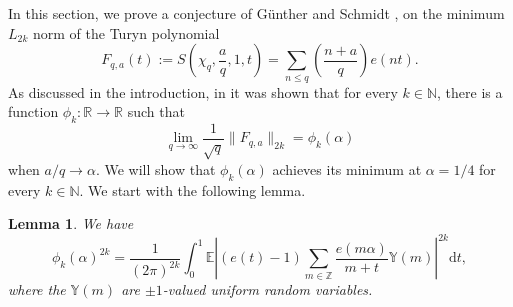 \documentclass[12pt, a4paper]{amsart}
\newtheorem{lemma}{Lemma}
\theoremstyle{remark}
\newcommand{\ud}{\mathrm{d}}
\newcommand{\bY}{\mathbb{Y}}
\begin{document}
In this section, we prove a conjecture of G\"unther and Schmidt \cite{GuentherSchmidt2017}, on the minimum $L_{2k}$ norm of the Turyn polynomial
\begin{equation}
    F_{q, a}(t) := S\left( \chi_q, \frac{a}{q}, 1, t \right) = \sum_{n\leq q} \left(\frac{n+a}{q}\right)e(nt).\nonumber
\end{equation}
As discussed in the introduction, in \cite{GuentherSchmidt2017} it was shown that for every $k\in\mathbb N$, there is a function $\phi_k:\mathbb R\to\mathbb R$ such that
\begin{equation}\nonumber
    \lim_{q\to\infty} \frac{1}{\sqrt q}\|F_{q, a}\|_{2k}=\phi_k(\alpha) 
\end{equation}
when $a/q\to \alpha$. We will show that $\phi_k(\alpha)$ achieves its minimum
at $\alpha = 1/4$ for every $k\in\mathbb N$. We start with the following lemma. 
\begin{lemma}
    We have
\begin{equation}\label{eq:phi_k}
    \phi_{k}(\alpha)^{2k} = \frac{1}{(2\pi)^{2k}}
    \int_0^1
        \mathbb E\left\lvert(e(t)-1)\sum_{m\in\mathbb Z}
        \frac{e(m\alpha)}{m+t}\bY(m)\right\rvert^{2k}\ud t, 
\end{equation}
where the $\bY(m)$ are $\pm 1$-valued uniform random variables.
\end{lemma}
\end{document}
